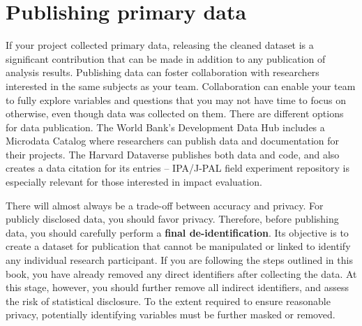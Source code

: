 
\section{Publishing primary data}

If your project collected primary data,
releasing the cleaned dataset is a significant contribution that can be made
in addition to any publication of analysis results.
Publishing data can foster collaboration with researchers
interested in the same subjects as your team.
Collaboration can enable your team to fully explore variables and
questions that you may not have time to focus on otherwise,
even though data was collected on them.
There are different options for data publication.
The World Bank's Development Data Hub
includes a Microdata Catalog
where researchers can publish data and documentation for their projects.
The Harvard Dataverse
publishes both data and code,
and also creates a data citation for its entries --
IPA/J-PAL field experiment repository is especially relevant
for those interested in impact evaluation.

There will almost always be a trade-off between accuracy and privacy.
For publicly disclosed data, you should favor privacy.
Therefore, before publishing data,
you should carefully perform a \textbf{final de-identification}.
Its objective is to create a dataset for publication
that cannot be manipulated or linked to identify any individual research participant.
If you are following the steps outlined in this book,
you have already removed any direct identifiers after collecting the data.
At this stage, however, you should further remove
all indirect identifiers, and assess the risk of statistical disclosure.
To the extent required to ensure reasonable privacy,
potentially identifying variables must be further masked or removed.

